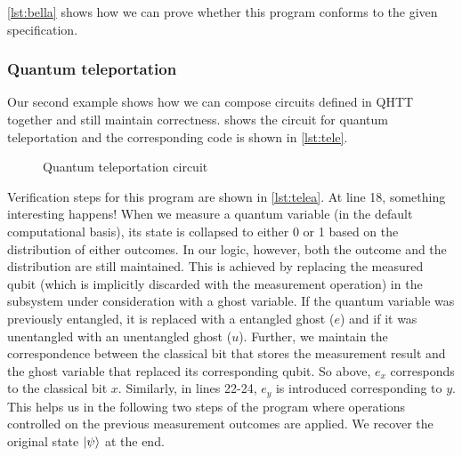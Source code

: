 \documentclass[adraft,creativecommons]{eptcs}
\theoremstyle{definition}
\theoremstyle{remark}
\begin{document}
\cref{lst:bella} shows how we can prove whether this program conforms to the given specification.



\subsubsection{Quantum teleportation}
\label{sec:teleport}
Our second example shows how we can compose circuits defined in QHTT together and still maintain correctness.  shows the circuit for quantum teleportation and the corresponding code is shown in \cref{lst:tele}.

\begin{figure}
    \centering
    \caption{Quantum teleportation circuit}
    \label{fig:teleport}
\end{figure}





Verification steps for this program are shown in \cref{lst:telea}. At line 18, something interesting happens! When we measure a quantum variable (in the default computational basis), its state is collapsed to either 0 or 1 based on the distribution of either outcomes. In our logic, however, both the outcome and the distribution are still maintained. This is achieved by replacing the measured qubit (which is implicitly discarded with the measurement operation) in the subsystem under consideration with a ghost variable. If the quantum variable was previously entangled, it is replaced with a entangled ghost ($e$) and if it was unentangled with an unentangled ghost ($u$). Further, we maintain the correspondence between the classical bit that stores the measurement result and the ghost variable that replaced its corresponding qubit. So above, $e_x$ corresponds to the classical bit $x$. Similarly, in lines 22-24, $e_y$ is introduced corresponding to $y$. This helps us in the following two steps of the program where operations controlled on the previous measurement outcomes are applied. We recover the original state $\ket{\psi}$ at the end.
\end{document}
